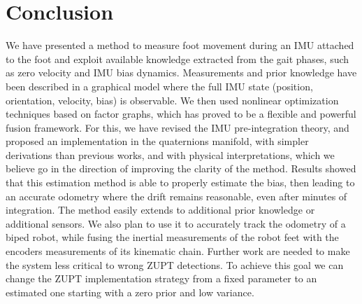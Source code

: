 
\section{Conclusion}

We have presented a method to measure foot movement during an IMU attached to the foot and exploit available knowledge extracted from the gait phases, such as zero velocity and IMU bias dynamics. 
Measurements and prior knowledge have been described in a graphical model where the full IMU state (position, orientation, velocity, bias) is observable. 
We then used nonlinear optimization techniques based on factor graphs, which has proved to be a flexible and powerful fusion framework. For this, we have revised the IMU pre-integration theory, and proposed an implementation in the quaternions manifold, with simpler derivations than previous works, and with physical interpretations, which we believe go in the direction of improving the clarity of the method.
Results showed that this estimation method is able to properly estimate the bias, then leading to an accurate odometry where the drift remains reasonable, even after minutes of integration. 
The method easily extends to additional prior knowledge or additional sensors. 
We also plan to use it to accurately track the odometry of a biped robot, while fusing the inertial measurements of the robot feet with the encoders measurements of its kinematic chain. 
Further work are needed to make the system less critical to wrong ZUPT detections. To achieve this goal we can change the ZUPT implementation strategy from a fixed parameter to an estimated one starting with a zero prior and low variance.
